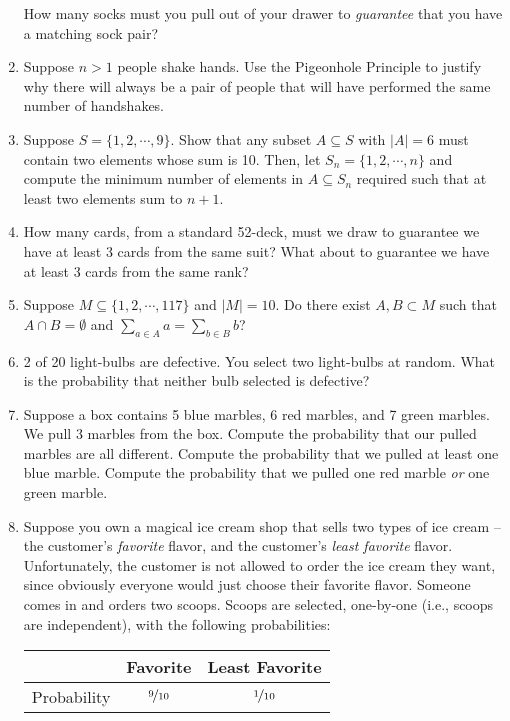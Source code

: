 \documentclass[main.tex]{subfiles}
\begin{document}
\begin{enumerate}
	How many socks must you pull out of your drawer to \textit{guarantee} that you have a matching sock pair?
	\item
	Suppose \(n>1\) people shake hands.
	Use the Pigeonhole Principle to justify why there will always be a pair of people that will have performed the same number of handshakes.
	\item
	Suppose \(S = \{1,2,\cdots,9\}\).
	Show that any subset \(A \subseteq S\) with \(|A| = 6\) must contain two elements whose sum is 10.
	Then, let \(S_n = \{1,2,\cdots,n\}\) and compute the minimum number of elements in \(A \subseteq S_n\) required such that at least two elements sum to \(n+1\).
	\item
	How many cards, from a standard 52-deck, must we draw to guarantee we have at least 3 cards from the same suit?
	What about to guarantee we have at least 3 cards from the same rank?
	\item
	Suppose \(M \subseteq \{1,2,\cdots,117\}\) and \(|M| = 10\).
	Do there exist \(A,B \subset M\) such that \(A \cap B = \emptyset\) and \(\sum_{a \in A} a = \sum_{b \in B} b\)?
	\item
	2 of 20 light-bulbs are defective.
	You select two light-bulbs at random. What is the probability that neither bulb selected is defective?
	\item
	Suppose a box contains 5 blue marbles, 6 red marbles, and 7 green marbles.
	We pull 3 marbles from the box.
	Compute the probability that our pulled marbles are all different.
	Compute the probability that we pulled at least one blue marble.
	Compute the probability that we pulled one red marble \textit{or} one green marble.
	\item
	Suppose you own a magical ice cream shop that sells two types of ice cream -- the customer's \textit{favorite} flavor, and the customer's \textit{least favorite} flavor.
	Unfortunately, the customer is not allowed to order the ice cream they want, since obviously everyone would just choose their favorite flavor.
	Someone comes in and orders two scoops.
	Scoops are selected, one-by-one (i.e., scoops are independent), with the following probabilities:
	\begin{center}
		\begin{tabular}{ccc}
			& Favorite & Least Favorite \\
			\midrule
			Probability & \(\nicefrac{9}{10}\) & \(\nicefrac{1}{10}\)
		\end{tabular}
	\end{center}
	\begin{enumerate}

\end{enumerate}
\end{enumerate}
\end{document}
